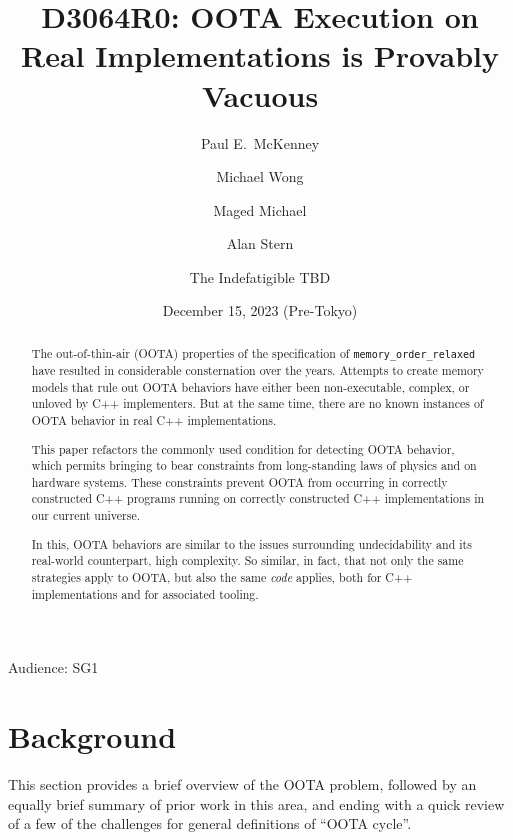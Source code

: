 \documentclass[10]{article}
\begin{document}
\title{D3064R0: OOTA Execution on Real Implementations is Provably Vacuous}

\newcommand{\co}[1]{\lstinline[breaklines=yes,breakatwhitespace=yes]{#1}}

\author{
Paul E.~McKenney\\ \and
Michael Wong\\ \and
Maged Michael\\ \and
Alan Stern\\ \and
The Indefatigible TBD
}
\date{December 15, 2023 (Pre-Tokyo)}
\maketitle{}

Audience: SG1

\begin{abstract}
	The out-of-thin-air (OOTA) properties of the specification
	of \co{memory_order_relaxed} have resulted in considerable
	consternation over the years.
	Attempts to create memory models that rule out OOTA behaviors
	have either been non-executable, complex, or unloved by C++
	implementers.
	But at the same time, there are no known instances of OOTA
	behavior in real C++ implementations.

	This paper refactors the commonly used condition for detecting
	OOTA behavior, which permits bringing to bear constraints from
	long-standing laws of physics and on hardware systems.
	These constraints prevent OOTA from occurring in correctly
	constructed C++ programs running on correctly constructed C++
	implementations in our current universe.

	In this, OOTA behaviors are similar to the issues surrounding
	undecidability and its real-world counterpart, high complexity.
	So similar, in fact, that not only the same strategies apply
	to OOTA, but also the same \emph{code} applies, both for C++
	implementations and for associated tooling.
\end{abstract}

\section{Background}
\label{sec:Background}

This section provides a brief overview of the OOTA problem, followed
by an equally brief summary of prior work in this area, and ending
with a quick review of a few of the challenges for general definitions of
``OOTA cycle''.
\end{document}
